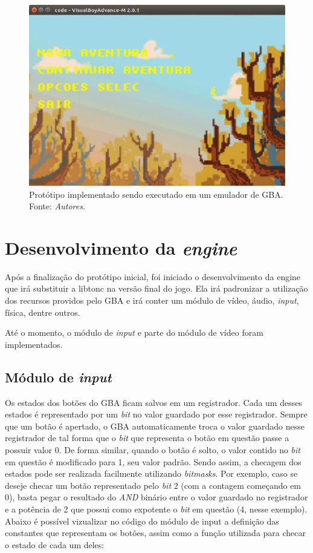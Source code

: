 \begin{figure}[H]
 \centering \includegraphics[keepaspectratio=true,scale=0.6]{figuras/tw-gba-1.eps}
   \caption{Protótipo implementado sendo executado em um emulador de GBA. Fonte: \textit{Autores}.}
   \label{tw-gba-1}
\end{figure}

\section{Desenvolvimento da \textit{engine}}

Após a finalização do protótipo inicial, foi iniciado o desenvolvimento da engine que irá substituir a libtonc na versão final do jogo. Ela irá padronizar a utilização dos recursos providos pelo GBA e irá conter um módulo de vídeo, áudio, \textit{input}, física, dentre outros.

Até o momento, o módulo de \textit{input} e parte do módulo de vídeo foram implementados.

\subsection{Módulo de \textit{input}}

Os estados dos botões do GBA ficam salvos em um registrador. Cada um desses estados é representado por um \textit{bit} no valor guardado por esse registrador. Sempre que um botão é apertado, o GBA automaticamente troca o valor guardado nesse registrador de tal forma que o \textit{bit} que representa o botão em questão passe a possuir valor 0. De forma similar, quando o botão é solto, o valor contido no \textit{bit} em questão é modificado para 1, seu valor padrão. Sendo assim, a checagem dos estados pode ser realizada facilmente utilizando \textit{bitmasks}. Por exemplo, caso se deseje checar um botão representado pelo \textit{bit} 2 (com a contagem começando em 0), basta pegar o resultado do \textit{AND} binário entre o valor guardado no registrador e a potência de 2 que possui como expotente o \textit{bit} em questão (4, nesse exemplo). Abaixo é possível vizualizar no código do módulo de input a definição das constantes que representam os botões, assim como a função utilizada para checar o estado de cada um deles:

